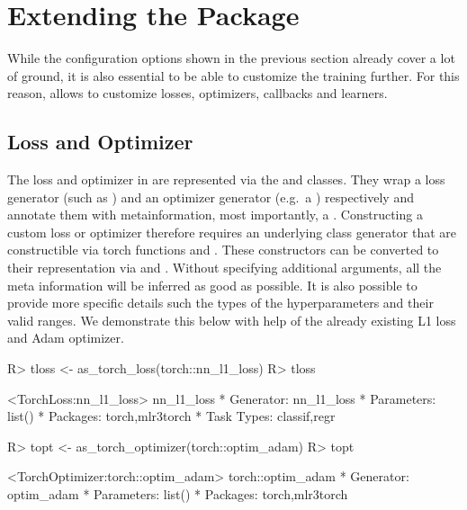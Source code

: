 \documentclass[article]{jss}
\theoremstyle{definition}
\begin{document}
\section{Extending the Package}\label{sec:extending}

While the configuration options shown in the previous section already cover a lot of ground, it is also essential to be able to customize the training further.
For this reason,  allows to customize losses, optimizers, callbacks and learners.

\subsection{Loss and Optimizer}\label{sec:extending-loss-opt}

The loss and optimizer in \mlrttorch{} are represented via the  and  classes.
They wrap a loss generator (such as ) and an optimizer generator (e.g.~a ) respectively and annotate them with metainformation, most importantly, a .
Constructing a custom loss or optimizer therefore requires an underlying class generator that are constructible via torch functions  and .
These constructors can be converted to their  representation via  and .
Without specifying additional arguments, all the meta information will be inferred as good as possible.
It is also possible to provide more specific details such the types of the hyperparameters and their valid ranges.
We demonstrate this below with help of the already existing L1 loss and Adam optimizer.

\begin{CodeInput}
R> tloss <- as_torch_loss(torch::nn_l1_loss)
R> tloss
\end{CodeInput}
\begin{CodeOutput}
<TorchLoss:nn_l1_loss> nn_l1_loss
* Generator: nn_l1_loss
* Parameters: list()
* Packages: torch,mlr3torch
* Task Types: classif,regr
\end{CodeOutput}
\begin{CodeInput}
R> topt <- as_torch_optimizer(torch::optim_adam)
R> topt
\end{CodeInput}
\begin{CodeOutput}
<TorchOptimizer:torch::optim_adam> torch::optim_adam
* Generator: optim_adam
* Parameters: list()
* Packages: torch,mlr3torch
\end{CodeOutput}
\end{document}

